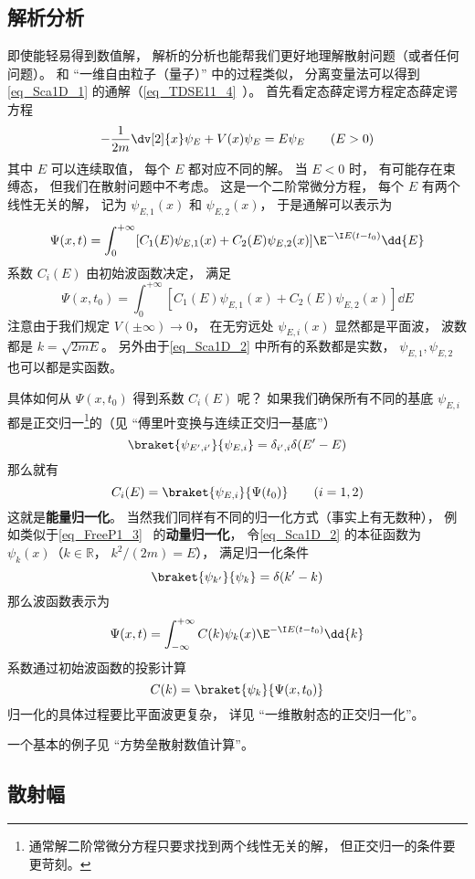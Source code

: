 \subsection{解析分析}
即使能轻易得到数值解， 解析的分析也能帮我们更好地理解散射问题（或者任何问题）。 和 “一维自由粒子（量子）” 中的过程类似， 分离变量法可以得到\autoref{eq_Sca1D_1} 的通解（\autoref{eq_TDSE11_4}~）。 首先看定态薛定谔方程定态薛定谔方程
\begin{equation}\label{eq_Sca1D_2}
-\frac{1}{2m}\dv[2]{x}\psi_E + V(x) \psi_E = E \psi_E \qquad (E > 0)
\end{equation}
其中 $E$ 可以连续取值， 每个 $E$ 都对应不同的解。 当 $E< 0$ 时， 有可能存在束缚态， 但我们在散射问题中不考虑。 这是一个二阶常微分方程， 每个 $E$ 有两个线性无关的解， 记为 $\psi_{E,1}(x)$ 和 $\psi_{E,2}(x)$， 于是通解可以表示为
\begin{equation}
\Psi(x, t) = \int_0^{+\infty} [C_1(E) \psi_{E,1}(x) + C_2(E) \psi_{E,2}(x)] \E^{-\I E (t-t_0)} \dd{E}
\end{equation}
系数 $C_i(E)$ 由初始波函数决定， 满足
\begin{equation}
\Psi(x, t_0) = \int_0^{+\infty} [C_1(E) \psi_{E,1}(x) + C_2(E) \psi_{E,2}(x)] \dd{E}
\end{equation}
注意由于我们规定 $V(\pm\infty)\to 0$， 在无穷远处 $\psi_{E,i}(x)$ 显然都是平面波， 波数都是 $k = \sqrt{2mE}$。 另外由于\autoref{eq_Sca1D_2} 中所有的系数都是实数， $\psi_{E,1}, \psi_{E,2}$ 也可以都是实函数。

具体如何从 $\Psi(x, t_0)$ 得到系数 $C_i(E)$ 呢？ 如果我们确保所有不同的基底 $\psi_{E,i}$ 都是正交归一\footnote{通常解二阶常微分方程只要求找到两个线性无关的解， 但正交归一的条件要更苛刻。}的（见 “傅里叶变换与连续正交归一基底”）
\begin{equation}
\braket{\psi_{E',i'}}{\psi_{E,i}} = \delta_{i',i}\delta(E' - E)
\end{equation}
那么就有
\begin{equation}
C_i(E) = \braket{\psi_{E,i}}{\Psi(t_0)} \qquad (i = 1,2)
\end{equation}
这就是\textbf{能量归一化}。 当然我们同样有不同的归一化方式（事实上有无数种）， 例如类似于\autoref{eq_FreeP1_3}~ 的\textbf{动量归一化}， 令\autoref{eq_Sca1D_2} 的本征函数为 $\psi_{k}(x)$（$k \in \mathbb R$， $k^2/(2m) = E$）， 满足归一化条件
\begin{equation}
\braket{\psi_{k'}}{\psi_{k}} = \delta(k' - k)
\end{equation}
那么波函数表示为
\begin{equation}\label{eq_Sca1D_3}
\Psi(x, t) = \int_{-\infty}^{+\infty} C(k) \psi_k(x)\E^{-\I E (t-t_0)} \dd{k}
\end{equation}
系数通过初始波函数的投影计算
\begin{equation}
C(k) = \braket{\psi_k}{\Psi(x, t_0)}
\end{equation}
归一化的具体过程要比平面波更复杂， 详见 “一维散射态的正交归一化”。

一个基本的例子见 “方势垒散射数值计算”。

\subsection{散射幅}
